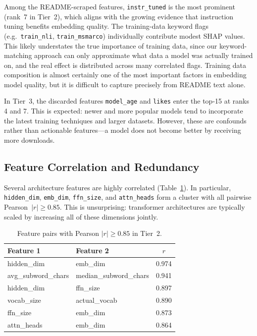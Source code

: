 \documentclass[11pt,a4paper,twocolumn]{article}
\begin{document}
Among the README-scraped features, \texttt{instr\_tuned} is the most prominent (rank~7 in Tier~2), which aligns with the growing evidence that instruction tuning benefits embedding quality.
The training-data keyword flags (e.g.\ \texttt{train\_nli}, \texttt{train\_msmarco}) individually contribute modest SHAP values.
This likely understates the true importance of training data, since our keyword-matching approach can only approximate what data a model was actually trained on, and the real effect is distributed across many correlated flags.
Training data composition is almost certainly one of the most important factors in embedding model quality, but it is difficult to capture precisely from README text alone.

In Tier~3, the discarded features \texttt{model\_age} and \texttt{likes} enter the top-15 at ranks 4 and 7.
This is expected: newer and more popular models tend to incorporate the latest training techniques and larger datasets.
However, these are confounds rather than actionable features---a model does not become better by receiving more downloads.

\subsection{Feature Correlation and Redundancy}
\label{sec:correlation}

Several architecture features are highly correlated (Table~\ref{tab:correlations}).
In particular, \texttt{hidden\_dim}, \texttt{emb\_dim}, \texttt{ffn\_size}, and \texttt{attn\_heads} form a cluster with all pairwise Pearson~$|r| \geq 0.85$.
This is unsurprising: transformer architectures are typically scaled by increasing all of these dimensions jointly.

\begin{table}[t]
\centering
\caption{Feature pairs with Pearson $|r| \geq 0.85$ in Tier~2.}
\label{tab:correlations}
\begin{tabular}{llc}
\toprule
Feature 1 & Feature 2 & $r$ \\
\midrule
hidden\_dim & emb\_dim & 0.974 \\
avg\_subword\_chars & median\_subword\_chars & 0.941 \\
hidden\_dim & ffn\_size & 0.897 \\
vocab\_size & actual\_vocab & 0.890 \\
ffn\_size & emb\_dim & 0.873 \\
attn\_heads & emb\_dim & 0.864 \\
\bottomrule
\end{tabular}
\end{table}
\end{document}
